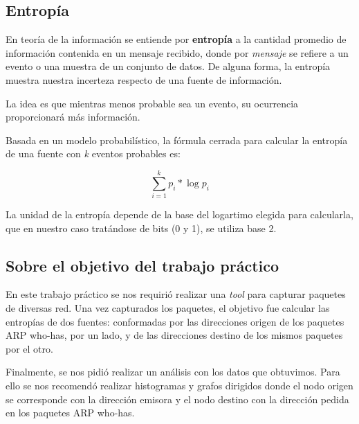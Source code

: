 \subsection{Entropía}

En teoría de la información se entiende por \textbf{entropía} a la cantidad promedio de información contenida en un mensaje recibido, donde por \textit{mensaje} se refiere a un evento o una muestra de un conjunto de datos. De alguna forma, la entropía muestra nuestra incerteza respecto de una fuente de información.\newline

La idea es que mientras menos probable sea un evento, su ocurrencia proporcionará más información.\newline

Basada en un modelo probabilístico, la fórmula cerrada para calcular la entropía de una fuente con \textit{k} eventos probables es:

$$\sum \limits_{i=1}^k p_i * \log{p_i}$$\newline

La unidad de la entropía depende de la base del logartimo elegida para calcularla, que en nuestro caso tratándose de bits (0 y 1), se utiliza base 2.\newline

\subsection{Sobre el objetivo del trabajo práctico}

En este trabajo práctico se nos requirió realizar una \textit{tool} para capturar paquetes de diversas red. Una vez capturados los paquetes, el objetivo fue calcular las entropías de dos fuentes: conformadas por las direcciones origen de los paquetes ARP who-has, por un lado, y de las direcciones destino de los mismos paquetes por el otro.\newline

Finalmente, se nos pidió realizar un análisis con los datos que obtuvimos. Para ello se nos recomendó realizar histogramas y grafos dirigidos donde el nodo origen se corresponde con la dirección emisora y el nodo destino con la dirección pedida en los paquetes ARP who-has.